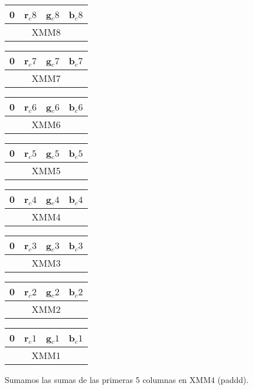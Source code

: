 \begin{table}[!h]
	\centering
	\begin{tabular}{| c | c | c | c |}
		\hline
		0 & r$_c8$ & g$_c8$ & b$_c8$
		\\ \hline
		\multicolumn{4}{c}{XMM8} \\
	\end{tabular}
	\begin{tabular}{| c | c | c | c |}
		\hline
		0 & r$_c7$ & g$_c7$ & b$_c7$
		\\ \hline
		\multicolumn{4}{c}{XMM7} \\
	\end{tabular}
	\begin{tabular}{| c | c | c | c |}
		\hline
		0 & r$_c6$ & g$_c6$ & b$_c6$
		\\ \hline
		\multicolumn{4}{c}{XMM6} \\
	\end{tabular}
	\begin{tabular}{| c | c | c | c |}
		\hline
		0 & r$_c5$ & g$_c5$ & b$_c5$
		\\ \hline
		\multicolumn{4}{c}{XMM5} \\
	\end{tabular}
	\begin{tabular}{| c | c | c | c |}
		\hline
		0 & r$_c4$ & g$_c4$ & b$_c4$
		\\ \hline
		\multicolumn{4}{c}{XMM4} \\
	\end{tabular}
		\begin{tabular}{| c | c | c | c |}
		\hline
		0 & r$_c3$ & g$_c3$ & b$_c3$
		\\ \hline
		\multicolumn{4}{c}{XMM3} \\
	\end{tabular}
		\begin{tabular}{| c | c | c | c |}
		\hline
		0 & r$_c2$ & g$_c2$ & b$_c2$
		\\ \hline
		\multicolumn{4}{c}{XMM2} \\
	\end{tabular}
		\begin{tabular}{| c | c | c | c |}
		\hline
		0 & r$_c1$ & g$_c1$ & b$_c1$
		\\ \hline
		\multicolumn{4}{c}{XMM1} \\
	\end{tabular}
\end{table}

Sumamos las sumas de las primeras 5 columnas en XMM4 (paddd).

